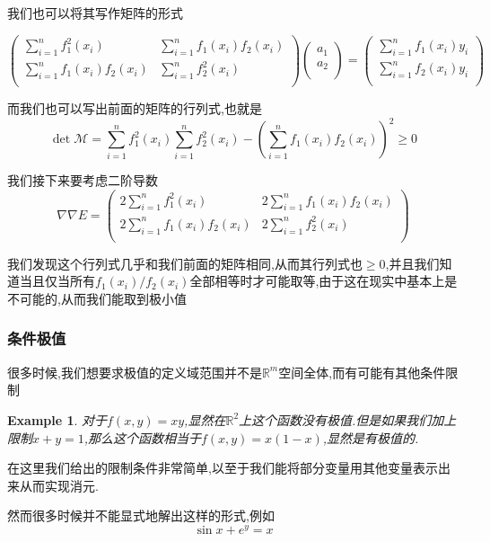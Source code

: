 \documentclass[11pt,hyperref,a4paper,UTF8]{ctexart}
\newtheorem{example}{Example}[subsection]
\newcommand{\RR}{\mathbb{R}}
\newcommand{\parameter}[1]{\left(#1\right)}
\begin{document}
\begin{CJK}{UTF8}{gkai}
我们也可以将其写作矩阵的形式

\[\begin{pmatrix}
  \sum_{i = 1}^{n}f_1^2(x_i)&\sum_{i = 1}^{n}f_1(x_i)f_2(x_i)\\
  \sum_{i = 1}^{n}f_1(x_i)f_2(x_i)&\sum_{i = 1}^{n}f_2^2(x_i)\\
\end{pmatrix}
\begin{pmatrix}
  a_1\\
  a_2\\
\end{pmatrix}
=
\begin{pmatrix}
  \sum_{i = 1}^{n}f_1(x_i)y_i\\
  \sum_{i = 1}^{n}f_2(x_i)y_i\\
\end{pmatrix}
\]

而我们也可以写出前面的矩阵的行列式,也就是
\[\det \mathcal{M} = \sum_{i = 1}^{n}f_1^2(x_i) \sum_{i = 1}^{n}f_2^2(x_i) - \parameter{\sum_{i = 1}^{n}f_1(x_i)f_2(x_i)}^2 \geq 0\]

我们接下来要考虑二阶导数
\[\nabla \nabla E = \begin{pmatrix}
  2 \sum_{i = 1}^{n}f_1^2(x_i)&2 \sum_{i = 1}^{n}f_1(x_i)f_2(x_i)\\
  2 \sum_{i = 1}^{n}f_1(x_i)f_2(x_i)&2 \sum_{i = 1}^{n}f_2^2(x_i)\\
\end{pmatrix}\]

我们发现这个行列式几乎和我们前面的矩阵相同,从而其行列式也$\geq 0$,并且我们知道当且仅当所有$f_1(x_i)/f_2(x_i)$全部相等时才可能取等,由于这在现实中基本上是不可能的,从而我们能取到极小值\\

\subsubsection{条件极值}

很多时候,我们想要求极值的定义域范围并不是$\RR^m$空间全体,而有可能有其他条件限制

\begin{example}
  对于$f(x,y)= xy$,显然在$\RR^2$上这个函数没有极值.但是如果我们加上限制$x + y = 1$,那么这个函数相当于$f(x,y) = x(1 - x)$,显然是有极值的.
\end{example}

在这里我们给出的限制条件非常简单,以至于我们能将部分变量用其他变量表示出来从而实现消元.

然而很多时候并不能显式地解出这样的形式,例如
\[\sin x + e^y = x\]


\end{CJK}
\end{document}

